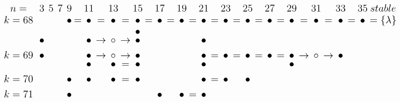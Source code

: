 \documentclass{article}
\begin{document}
\(
\begin{tikzcd}[
nodes={font=\Large,inner sep=0pt},
row sep=0.2cm,
column sep=0.1cm
]
n= && & 3 & & 5 & & 7 & & 9 & & 11 & & 13 & & 15 & & 17 && 19 && 21 && 23 && 25 && 27 && 29 && 31 && 33 && 35 & stable \\
k=68 &&& && && && \bullet &=& \bullet &=& \bullet &=& \bullet &=& \bullet &=& \bullet &=& \bullet &=& \bullet &=& \bullet &=& \bullet &=& \bullet &=& \bullet &=& \bullet &=& \bullet & =\{\lambda\} \\
&&& && && && && && && \bullet && && && && \\
&&& \bullet && && && && \bullet &\rightarrow& \circ &\rightarrow& \bullet && && && \bullet \\ \\
k=69 &&& \bullet && && && && \bullet &\rightarrow& \circ &\rightarrow& \bullet && && && \bullet &=& \bullet &=& \bullet &=& \bullet &=& \bullet &\rightarrow& \circ &\rightarrow& \bullet \\
&&& && && && && \bullet && \bullet &=& \bullet && && && \bullet && && && && \bullet \\ \\
k=70 &&& && && && \bullet && \bullet && \bullet &=& \bullet && && && \bullet &=& \bullet && \bullet \\ \\
k=71 &&& && && && \bullet && && && && \bullet && \bullet &=& \bullet \\
\\
\end{tikzcd}
\)
\end{document}
